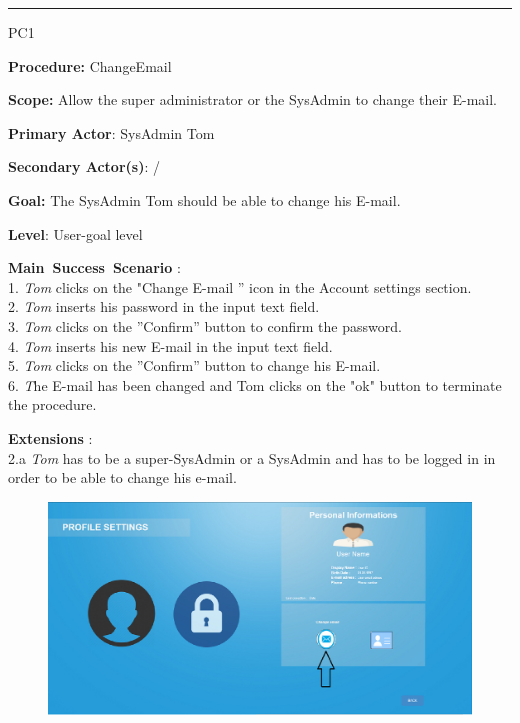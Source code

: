 \hrule
\vspace{0.5cm}
\begin{lyxlist}{PC1}
\small{
\item [\textbf{Procedure:}] ChangeEmail 
\item [\textbf{Scope:}] Allow the super administrator or the SysAdmin to change
their E-mail.
\item [\textbf{Primary Actor}:] SysAdmin Tom
\item [\textbf{Secondary Actor(s)}:] /
\item [\textbf{Goal:}] The SysAdmin Tom should be able to change his E-mail.
\item [\textbf{Level}:] User-goal level
\item [\textbf{Main~Success~Scenario}]:\\
1. \emph{Tom} clicks on the "Change E-mail '' icon in the Account settings
section.\\
2. \emph{Tom} inserts his password in the input text field.\\
3. \emph{Tom} clicks on the ''Confirm'' button to confirm the password.\\
4. \emph{Tom} inserts his new E-mail in the input text field.\\
5. \emph{Tom} clicks on the ''Confirm'' button to change his E-mail.\\
6. \emph The E-mail has been changed and {Tom} clicks on the "ok" button to
terminate the procedure.\\

\item [\textbf{Extensions}]:\\
2.a \emph{Tom} has to be a super-SysAdmin or a SysAdmin and has to be logged in
in order to be able to change his e-mail.\\
}

\begin{figure}[H]
\centering
\includegraphics[width=170mm]{images/ChangeEmail1.eps}
\caption{\label{overflow}}
\end{figure}


\end{lyxlist}
